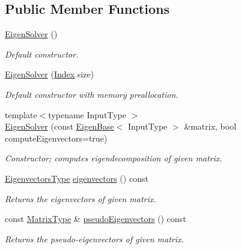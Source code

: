 \subsection*{Public Member Functions}
\begin{DoxyCompactItemize}
\item 
\mbox{\hyperlink{class_eigen_1_1_eigen_solver_a3af22d721a6401365881b2ef252d26aa}{Eigen\+Solver}} ()
\begin{DoxyCompactList}\small\item\em Default constructor. \end{DoxyCompactList}\item 
\mbox{\hyperlink{class_eigen_1_1_eigen_solver_aa4edf56ecc178b277b75c13a2ca1089f}{Eigen\+Solver}} (\mbox{\hyperlink{class_eigen_1_1_eigen_solver_a5bff6a6bc0efac67d52c60c2c3deb9ee}{Index}} size)
\begin{DoxyCompactList}\small\item\em Default constructor with memory preallocation. \end{DoxyCompactList}\item 
{\footnotesize template$<$typename Input\+Type $>$ }\\\mbox{\hyperlink{class_eigen_1_1_eigen_solver_a7e8ab3d89ea525af5f27f1a8e805fae1}{Eigen\+Solver}} (const \mbox{\hyperlink{struct_eigen_1_1_eigen_base}{Eigen\+Base}}$<$ Input\+Type $>$ \&matrix, bool compute\+Eigenvectors=true)
\begin{DoxyCompactList}\small\item\em Constructor; computes eigendecomposition of given matrix. \end{DoxyCompactList}\item 
\mbox{\hyperlink{class_eigen_1_1_eigen_solver_aa140354e2f7d5ce34c6488c39e19f2c2}{Eigenvectors\+Type}} \mbox{\hyperlink{class_eigen_1_1_eigen_solver_a66288022802172e3ee059283b26201d7}{eigenvectors}} () const
\begin{DoxyCompactList}\small\item\em Returns the eigenvectors of given matrix. \end{DoxyCompactList}\item 
const \mbox{\hyperlink{class_eigen_1_1_eigen_solver_a83acd180404ddaac8a678fa65a6b632b}{Matrix\+Type}} \& \mbox{\hyperlink{class_eigen_1_1_eigen_solver_a4e796226f06e1f7347cf03a38755a155}{pseudo\+Eigenvectors}} () const
\begin{DoxyCompactList}\small\item\em Returns the pseudo-\/eigenvectors of given matrix. \end{DoxyCompactList}\item 

\end{DoxyCompactItemize}
